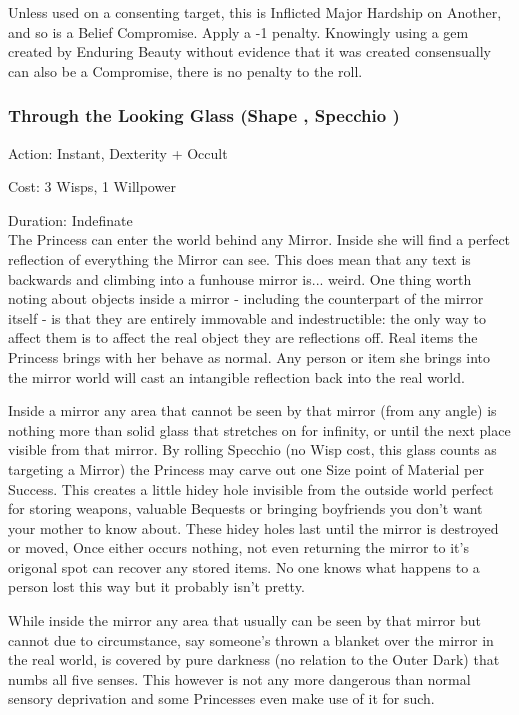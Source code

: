 Unless used on a consenting target, this is Inflicted Major Hardship on Another, and so is a Belief Compromise. Apply a -1 penalty. Knowingly using a gem created by Enduring Beauty without evidence that it was created consensually can also be a Compromise, there is no penalty to the roll.
	
\subsubsection*{Through the Looking Glass (Shape \textbullet\textbullet\textbullet\textbullet, Specchio \textbullet\textbullet\textbullet\textbullet\textbullet)}

\noindent Action: Instant, Dexterity + Occult

\noindent Cost: 3 Wisps, 1 Willpower

\noindent Duration: Indefinate \\

\noindent The Princess can enter the world behind any Mirror. Inside she will find a perfect reflection of everything the Mirror can see. This does mean that any text is backwards and climbing into a funhouse mirror is... weird. One thing worth noting about objects inside a mirror - including the counterpart of the mirror itself - is that they are entirely immovable and indestructible: the only way to affect them is to affect the real object they are reflections off. Real items the Princess brings with her behave as normal. Any person or item she brings into the mirror world will cast an intangible reflection back into the real world.

Inside a mirror any area that cannot be seen by that mirror (from any angle) is nothing more than solid glass that stretches on for infinity, or until the next place visible from that mirror. By rolling Specchio (no Wisp cost, this glass counts as targeting a Mirror) the Princess may carve out one Size point of Material per Success. This creates a little hidey hole invisible from the outside world perfect for storing weapons, valuable Bequests or bringing boyfriends you don't want your mother to know about. These hidey holes last until the mirror is destroyed or moved, Once either occurs nothing, not even returning the mirror to it's origonal spot can recover any stored items. No one knows what happens to a person lost this way but it probably isn't pretty.

While inside the mirror any area that usually can be seen by that mirror but cannot due to circumstance, say someone's thrown a blanket over the mirror in the real world, is covered by pure darkness (no relation to the Outer Dark) that numbs all five senses. This however is not any more dangerous than normal sensory deprivation and some Princesses even make use of it for such.

